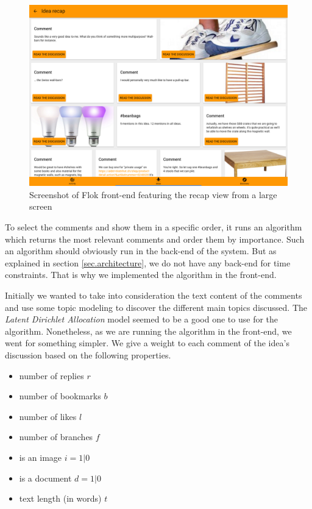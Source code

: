 \documentclass[a4paper,12pt,twoside]{article}
\begin{document}
\begin{figure}[!htb]
    \centering
    \includegraphics[width=\textwidth]{images/recapDesktop.png}
    \caption{Screenshot of Flok front-end featuring the recap view from a large screen}
    \label{fig.recap.desktop}
\end{figure}

To select the comments and show them in a specific order, it runs an algorithm which returns the most relevant comments and order them by importance.
Such an algorithm should obviously run in the back-end of the system.
But as explained in section \ref{sec.architecture}, we do not have any back-end for time constraints.
That is why we implemented the algorithm in the front-end.

Initially we wanted to take into consideration the text content of the comments and use some topic modeling to discover the different main topics discussed.
The \emph{Latent Dirichlet Allocation} \cite{blei2003latent} model seemed to be a good one to use for the algorithm.
Nonetheless, as we are running the algorithm in the front-end, we went for something simpler.
We give a weight to each comment of the idea's discussion based on the following properties.

\begin{multicols}{2}
    \begin{itemize}
        \item number of replies $r$
        \item number of bookmarks $b$
        \item number of likes $l$
        \item number of branches $f$
        \item is an image $i = 1 | 0$
        \item is a document $d = 1 | 0$
        \item text length (in words) $t$
    \end{itemize}
\end{multicols}
\end{document}
